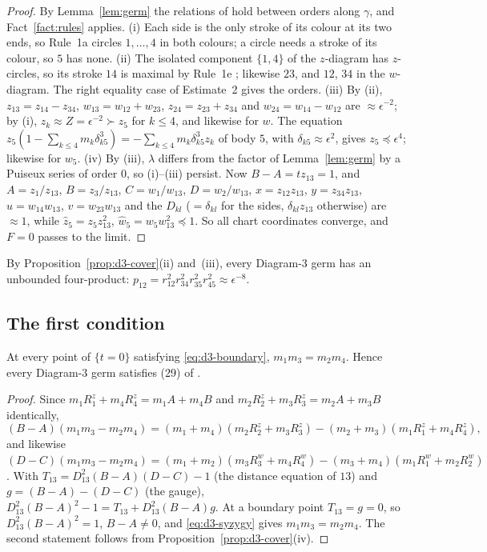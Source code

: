 \begin{proof}
By Lemma~\ref{lem:germ} the relations of \cite[\S3]{AK} hold between orders along $\gamma$, and
Fact~\ref{fact:rules} applies.  (i) Each side is the only stroke of its colour at its two ends, so
Rule~1a \cite[pp.~545--546]{AK} circles $1,\dots,4$ in both colours; a circle needs a stroke of
its colour, so $5$ has none.
(ii) The isolated component $\{1,4\}$ of the $z$-diagram has $z$-circles, so its stroke $14$ is
maximal by Rule~1e \cite[p.~546]{AK}; likewise $23$, and $12$, $34$ in the $w$-diagram.  The right
equality case of Estimate~2 \cite[p.~548]{AK} gives the orders.
(iii) By (ii), $z_{13}=z_{14}-z_{34}$, $w_{13}=w_{12}+w_{23}$, $z_{24}=z_{23}+z_{34}$ and
$w_{24}=w_{14}-w_{12}$ are $\approx\epsilon^{-2}$; by (i), $z_k\approx Z=\epsilon^{-2}\succ z_5$ for
$k\le4$, and likewise for $w$.  The equation
$z_5(1-\sum_{k\le4}m_k\delta_{k5}^3)=-\sum_{k\le4}m_k\delta_{k5}^3z_k$ of body $5$, with
$\delta_{k5}\approx\epsilon^2$, gives $z_5\preccurlyeq\epsilon^4$; likewise for $w_5$.
(iv) By (iii), $\lambda$ differs from the factor of Lemma~\ref{lem:germ} by a Puiseux series of
order $0$, so (i)--(iii) persist.  Now $B-A=tz_{13}=1$, and $A=z_1/z_{13}$, $B=z_3/z_{13}$,
$C=w_1/w_{13}$, $D=w_2/w_{13}$, $x=z_{12}z_{13}$, $y=z_{34}z_{13}$, $u=w_{14}w_{13}$,
$v=w_{23}w_{13}$ and the $D_{kl}$ ($=\delta_{kl}$ for the sides, $\delta_{kl}z_{13}$ otherwise) are
$\approx1$, while $\hat z_5=z_5z_{13}^2$, $\hat w_5=w_5w_{13}^2\preccurlyeq1$.  So all chart
coordinates converge, and $F=0$ passes to the limit.
\end{proof}

By Proposition~\ref{prop:d3-cover}(ii) and~(iii), every Diagram-3 germ has an unbounded
four-product: $p_{12}=r_{12}^2r_{34}^2r_{35}^2r_{45}^2\approx\epsilon^{-8}$.

\subsection{The first condition}

\begin{proposition}\label{prop:d3-first}
At every point of $\{t=0\}$ satisfying \eqref{eq:d3-boundary}, $m_1m_3=m_2m_4$.  Hence every
Diagram-3 germ satisfies (29) of \cite[\S8.3]{AK}.
\end{proposition}

\begin{proof}
Since $m_1R^z_1+m_4R^z_4=m_1A+m_4B$ and $m_2R^z_2+m_3R^z_3=m_2A+m_3B$ identically,
\begin{equation}\label{eq:d3-syzygy}
(B-A)(m_1m_3-m_2m_4)=(m_1+m_4)(m_2R^z_2+m_3R^z_3)-(m_2+m_3)(m_1R^z_1+m_4R^z_4),
\end{equation}
and likewise
$(D-C)(m_1m_3-m_2m_4)=(m_1+m_2)(m_3R^w_3+m_4R^w_4)-(m_3+m_4)(m_1R^w_1+m_2R^w_2)$.  With
$T_{13}=D_{13}^2(B-A)(D-C)-1$ (the distance equation of $13$) and $g=(B-A)-(D-C)$ (the gauge),
$D_{13}^2(B-A)^2-1=T_{13}+D_{13}^2(B-A)g$.  At a boundary point $T_{13}=g=0$, so
$D_{13}^2(B-A)^2=1$, $B-A\ne0$, and \eqref{eq:d3-syzygy} gives $m_1m_3=m_2m_4$.  The second
statement follows from Proposition~\ref{prop:d3-cover}(iv).
\end{proof}

